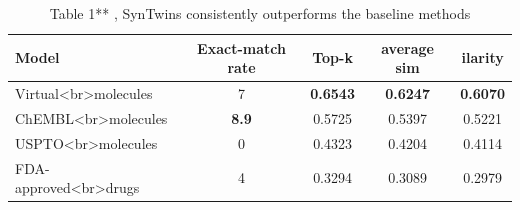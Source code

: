 \begin{table}[t]
\centering
\caption{Table 1** , SynTwins consistently outperforms the baseline methods}
\label{tab:2507.02752}
\begin{tabular}{lcccc}
\toprule
Model & Exact-match rate & Top-k & average sim & ilarity \\
\midrule
Virtual<br>molecules & 7 & \textbf{0.6543} & \textbf{0.6247} & \textbf{0.6070} \\
ChEMBL<br>molecules & \textbf{8.9} & 0.5725 & 0.5397 & 0.5221 \\
USPTO<br>molecules & 0 & 0.4323 & 0.4204 & 0.4114 \\
FDA-approved<br>drugs & 4 & 0.3294 & 0.3089 & 0.2979 \\
\bottomrule
\end{tabular}
\end{table}
